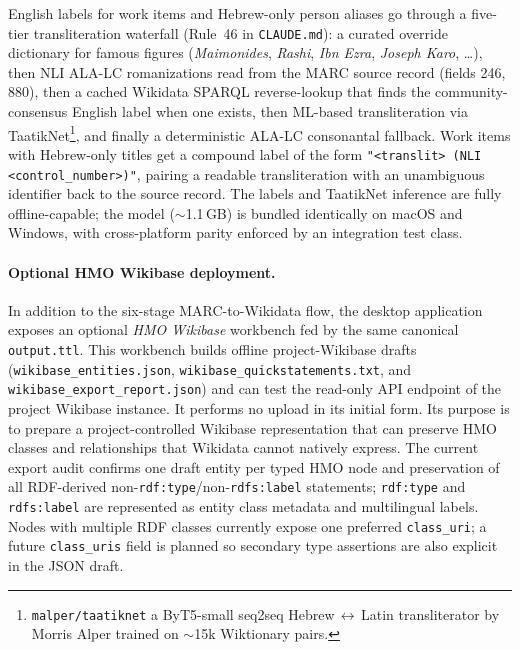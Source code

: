 \documentclass[12pt]{article}
\newcommand{\filepath}[1]{\texttt{\small #1}}
\newcommand{\code}[1]{\texttt{#1}}
\begin{document}
\begin{description}[style=nextline, leftmargin=2cm]
  English labels for work items and Hebrew-only person aliases go through a five-tier transliteration waterfall (Rule~46 in \filepath{CLAUDE.md}): a curated override dictionary for famous figures (\textit{Maimonides}, \textit{Rashi}, \textit{Ibn Ezra}, \textit{Joseph Karo}, …), then NLI ALA-LC romanizations read from the MARC source record (fields 246, 880), then a cached Wikidata SPARQL reverse-lookup that finds the community-consensus English label when one exists, then ML-based transliteration via TaatikNet\footnote{\code{malper/taatiknet} \textemdash{} a ByT5-small seq2seq Hebrew\,$\leftrightarrow$\,Latin transliterator by Morris Alper trained on $\sim$15k Wiktionary pairs.}, and finally a deterministic ALA-LC consonantal fallback. Work items with Hebrew-only titles get a compound label of the form \code{"\textless translit\textgreater{} (NLI \textless control\_number\textgreater)"}, pairing a readable transliteration with an unambiguous identifier back to the source record. The labels and TaatikNet inference are fully offline-capable; the model ($\sim$1.1\,GB) is bundled identically on macOS and Windows, with cross-platform parity enforced by an integration test class.
\end{description}

\paragraph{Optional HMO Wikibase deployment.}
In addition to the six-stage MARC-to-Wikidata flow, the desktop application exposes an optional \emph{HMO Wikibase} workbench fed by the same canonical \code{output.ttl}. This workbench builds offline project-Wikibase drafts (\code{wikibase\_entities.json}, \code{wikibase\_quickstatements.txt}, and \code{wikibase\_export\_report.json}) and can test the read-only API endpoint of the project Wikibase instance. It performs no upload in its initial form. Its purpose is to prepare a project-controlled Wikibase representation that can preserve HMO classes and relationships that Wikidata cannot natively express. The current export audit confirms one draft entity per typed HMO node and preservation of all RDF-derived non-\code{rdf:type}/non-\code{rdfs:label} statements; \code{rdf:type} and \code{rdfs:label} are represented as entity class metadata and multilingual labels. Nodes with multiple RDF classes currently expose one preferred \code{class\_uri}; a future \code{class\_uris} field is planned so secondary type assertions are also explicit in the JSON draft.
\end{document}
